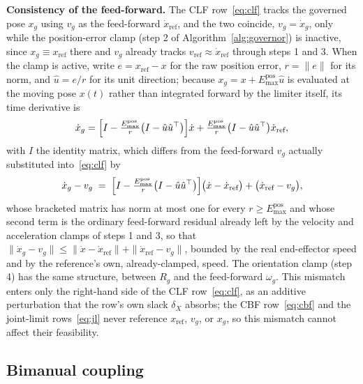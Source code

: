 \documentclass[12pt,a4paper,twoside,openright]{report}
\begin{document}
\textbf{Consistency of the feed-forward.} The CLF row~\eqref{eq:clf} tracks the governed pose $x_g$ using $v_g$ as the feed-forward $\dot{x}_{\text{ref}}$, and the two coincide, $v_g = \dot{x}_g$, only while the position-error clamp (step 2 of Algorithm~\ref{alg:governor}) is inactive, since $x_g \equiv x_{\text{ref}}$ there and $v_g$ already tracks $v_{\text{ref}} \approx \dot{x}_{\text{ref}}$ through steps 1 and 3. When the clamp is active, write $e = x_{\text{ref}} - x$ for the raw position error, $r = \|e\|$ for its norm, and $\hat{u} = e/r$ for its unit direction; because $x_g = x + E_{\max}^{\text{pos}}\hat{u}$ is evaluated at the moving pose $x(t)$ rather than integrated forward by the limiter itself, its time derivative is
\begin{equation}
\dot{x}_g = \Bigl[I - \tfrac{E_{\max}^{\text{pos}}}{r}\bigl(I - \hat{u}\hat{u}^{\top}\bigr)\Bigr]\dot{x} + \tfrac{E_{\max}^{\text{pos}}}{r}\bigl(I - \hat{u}\hat{u}^{\top}\bigr)\dot{x}_{\text{ref}},
\label{eq:govmismatch}
\end{equation}
with $I$ the identity matrix, which differs from the feed-forward $v_g$ actually substituted into~\eqref{eq:clf} by
\begin{equation}
\dot{x}_g - v_g \;=\; \Bigl[I - \tfrac{E_{\max}^{\text{pos}}}{r}\bigl(I - \hat{u}\hat{u}^{\top}\bigr)\Bigr]\bigl(\dot{x} - \dot{x}_{\text{ref}}\bigr) + \bigl(\dot{x}_{\text{ref}} - v_g\bigr),
\label{eq:govmismatchbound}
\end{equation}
whose bracketed matrix has norm at most one for every $r \ge E_{\max}^{\text{pos}}$ and whose second term is the ordinary feed-forward residual already left by the velocity and acceleration clamps of steps 1 and 3, so that $\|\dot{x}_g - v_g\| \le \|\dot{x} - \dot{x}_{\text{ref}}\| + \|\dot{x}_{\text{ref}} - v_g\|$, bounded by the real end-effector speed and by the reference's own, already-clamped, speed. The orientation clamp (step 4) has the same structure, between $R_g$ and the feed-forward $\omega_g$. This mismatch enters only the right-hand side of the CLF row~\eqref{eq:clf}, as an additive perturbation that the row's own slack $\delta_X$ absorbs; the CBF row~\eqref{eq:cbf} and the joint-limit rows~\eqref{eq:jl} never reference $x_{\text{ref}}$, $v_g$, or $x_g$, so this mismatch cannot affect their feasibility.

\subsection{Bimanual coupling}
\label{sec:bimanual}
\end{document}

